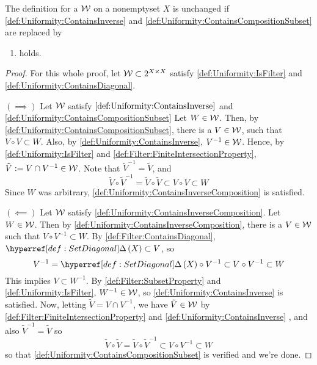 \begin{prop}
\label{prop:UniformityCharacterization}
The definition for a \Uniformity $\mathcal{W}$ on a nonemptyset $X$ 
is unchanged if 
\ref{def:Uniformity:ContainsInverse} and 
\ref{def:Uniformity:ContainsCompositionSubset} are replaced by 
\begin{enumerate}[label=(\roman*), ref={\ref{prop:UniformityCharacterization}~\roman*}]
\item \label{def:Uniformity:ContainsInverseComposition} 
 holds.
\end{enumerate}
\begin{proof}
For this whole proof, let $\mathcal{W} \subset 2^{X \times X}$ satisfy
\ref{def:Uniformity:IsFilter} and 
\ref{def:Uniformity:ContainsDiagonal}.

$(\implies)$ Let $\mathcal{W}$ satisfy $\ref{def:Uniformity:ContainsInverse}$ 
and \ref{def:Uniformity:ContainsCompositionSubset}
Let $W \in \mathcal{W}$.
Then, by \ref{def:Uniformity:ContainsCompositionSubset}, there is a $V \in \mathcal{W}$,
such that $V \circ V \subset W$. 
Also,  by \ref{def:Uniformity:ContainsInverse}, $V^{-1} \in \mathcal{W}$. 
Hence, by \ref{def:Uniformity:IsFilter} and \ref{def:Filter:FiniteIntersectionProperty}, 
$\tilde{V}:=V \cap V^{-1} \in \mathcal{W}$. 
Note that $\tilde{V}^{-1}=\tilde{V}$, and 
\begin{equation*}
\tilde{V} \circ \tilde{V}^{-1} = \tilde{V} \circ \tilde{V} \subset V \circ V \subset W
\end{equation*}
Since $W$ was arbitrary, \ref{def:Uniformity:ContainsInverseComposition} is satisfied. 

$(\impliedby)$ Let $\mathcal{W}$ satisfy \ref{def:Uniformity:ContainsInverseComposition}.
Let $W \in \mathcal{W}$. Then by \ref{def:Uniformity:ContainsInverseComposition}, there is a 
$V \in \mathcal{W}$ such that $V \circ V^{-1} \subset W$. 
By \ref{def:Filter:ContainsDiagonal}, $\scSetDiagonal{X} \subset V$, so 
\begin{equation*}
    V^{-1} = \scSetDiagonal{X} \circ V^{-1} \subset V \circ V^{-1} \subset W
\end{equation*}
This implies $V \subset W^{-1}$. By \ref{def:Filter:SubsetProperty} and \ref{def:Uniformity:IsFilter}, $W^{-1} \in \mathcal{W}$, so \ref{def:Uniformity:ContainsInverse} is satisfied. 
Now, letting 
$\tilde{V} = V \cap V^{-1}$, we have $\tilde{V} \in \mathcal{W}$ by 
\ref{def:Filter:FiniteIntersectionProperty} and \ref{def:Uniformity:ContainsInverse}
, and also $\tilde{V}^{-1} = \tilde{V}$ so 
\begin{equation*}
\tilde{V} \circ \tilde{V} = \tilde{V} \circ \tilde{V}^{-1} \subset V \circ V^{-1} \subset W
\end{equation*}
so that \ref{def:Uniformity:ContainsCompositionSubset} is verified and we're done. 



\end{proof}
\end{prop}
